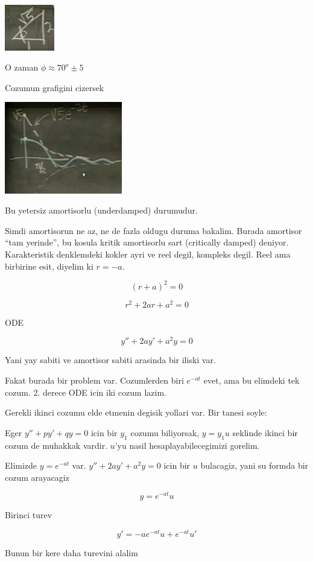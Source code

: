 \documentclass[12pt,fleqn]{article}
\begin{document}
\includegraphics[height=2cm]{9_3.png}

O zaman $\phi \approx 70^{o} \pm 5$

Cozumun grafigini cizersek

\includegraphics[height=4cm]{9_4.png}

Bu yetersiz amortisorlu (underdamped) durumudur. 

Simdi amortisorun ne az, ne de fazla oldugu duruma bakalim. Burada
amortisor ``tam yerinde'', bu kosula kritik amortisorlu sart (critically
damped) deniyor. Karakteristik denklemdeki kokler ayri ve reel degil,
kompleks degil. Reel ama birbirine esit, diyelim ki $r = -a$. 

\[ (r+a)^2 = 0 \]

\[ r^2 + 2ar + a^2 = 0 \]

ODE

\[ y'' + 2ay' + a^2y = 0 \]

Yani yay sabiti ve amortisor sabiti arasinda bir iliski var. 

Fakat burada bir problem var. Cozumlerden biri $e^{-at}$ evet, ama bu
elimdeki tek cozum. 2. derece ODE icin iki cozum lazim. 

Gerekli ikinci cozumu elde etmenin degisik yollari var. Bir tanesi soyle:

Eger $y'' + py' + qy = 0$ icin bir $y_1$ cozumu biliyorsak, $y = y_1 u$
seklinde ikinci bir cozum de muhakkak vardir. $u$'yu nasil
hesaplayabilecegimizi gorelim.

Elimizde $y = e^{-at}$ var. $y'' + 2ay' + a^2y = 0$ icin bir $u$ bulacagiz,
yani su formda bir cozum arayacagiz

\[ y = e^{-at} u \]

Birinci turev

\[ y' = -a e^{-at}u + e^{-at} u' \]

Bunun bir kere daha turevini alalim
\end{document}
